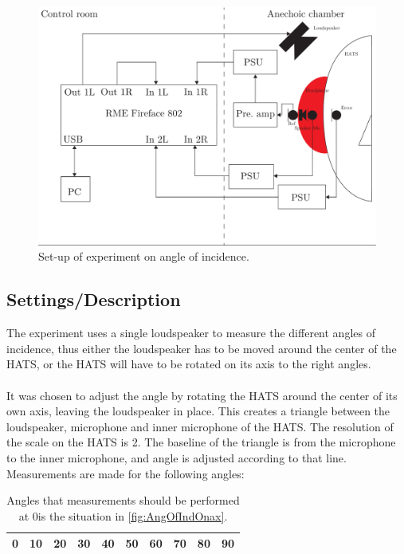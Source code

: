 \begin{figure}[H]
	\centering
	\includegraphics[width=\textwidth]{../Journal/Experiments/AngleOfIncidence/AngleOfIncidenceSetup.pdf}
	\caption{Set-up of experiment on angle of incidence.}
	\label{Fig:AngleOfIncidenceSetup}
\end{figure}



\subsection{Settings/Description}\label{sec:AngleDescription}
The experiment uses a single loudspeaker to measure the  different angles of incidence, thus either the loudspeaker has to be moved around the center of the HATS, or the HATS will have to be rotated on its axis to the right angles. \\\\
It was chosen to adjust the angle by rotating the HATS around the center of its own axis, leaving the loudspeaker in place. This creates a triangle between the loudspeaker, microphone and inner microphone of the HATS. The resolution of the scale on the HATS is 2\degrees. The baseline of the triangle is from the microphone to the inner microphone, and angle is adjusted according to that line.
Measurements are made for the following angles:
\begin{table}[H]
	\centering
	\begin{tabular}{c c c c c c c c c c} \toprule
		0\degrees & 10\degrees & 20\degrees & 30\degrees & 40\degrees & 50\degrees & 60\degrees & 70\degrees & 80\degrees & 90\degrees \\ \bottomrule
	\end{tabular}
\caption{Angles that measurements should be performed at 0\degrees  is the situation in \autoref{fig:AngOfIndOnax}.}
\label{Tab:AngleOfInciMeasAngles}
\end{table}
 


